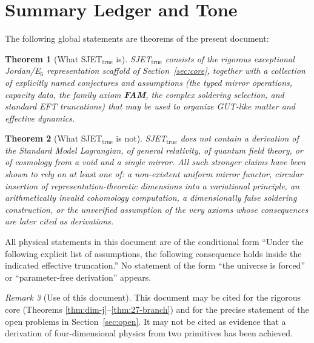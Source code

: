 \documentclass[11pt]{article}
\theoremstyle{plain}
\newtheorem{theorem}{Theorem}[section]
\theoremstyle{definition}
\theoremstyle{remark}
\newtheorem{remark}[theorem]{Remark}
\numberwithin{equation}{section}
\begin{document}
\section{Summary Ledger and Tone}

The following global statements are theorems of the present document:

\begin{theorem}[What SJET$_{\mathrm{true}}$ is]\label{thm:summary-what}
SJET$_{\mathrm{true}}$ consists of the rigorous exceptional Jordan/E$_6$ representation scaffold of Section~\ref{sec:core}, together with a collection of explicitly named conjectures and assumptions (the typed mirror operations, capacity data, the family axiom \textbf{FAM}, the complex soldering selection, and standard EFT truncations) that may be used to organize GUT-like matter and effective dynamics.
\end{theorem}

\begin{theorem}[What SJET$_{\mathrm{true}}$ is not]\label{thm:summary-not}
SJET$_{\mathrm{true}}$ does not contain a derivation of the Standard Model Lagrangian, of general relativity, of quantum field theory, or of cosmology from a void and a single mirror. All such stronger claims have been shown to rely on at least one of: a non-existent uniform mirror functor, circular insertion of representation-theoretic dimensions into a variational principle, an arithmetically invalid cohomology computation, a dimensionally false soldering construction, or the unverified assumption of the very axioms whose consequences are later cited as derivations.
\end{theorem}

All physical statements in this document are of the conditional form ``Under the following explicit list of assumptions, the following consequence holds inside the indicated effective truncation.'' No statement of the form ``the universe is forced'' or ``parameter-free derivation'' appears.

\begin{remark}[Use of this document]
This document may be cited for the rigorous core (Theorems \ref{thm:dim-j}--\ref{thm:27-branch}) and for the precise statement of the open problems in Section~\ref{sec:open}. It may not be cited as evidence that a derivation of four-dimensional physics from two primitives has been achieved.
\end{remark}
\end{document}
